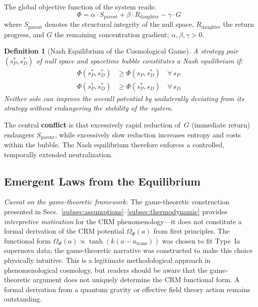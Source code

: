\documentclass[aps,prd,twocolumn,superscriptaddress,nofootinbib]{revtex4-2}
\newtheorem{definition}{Definition}
\begin{document}
The global objective function of the system reads:
\begin{equation}
\Phi = \alpha \cdot S_{\mathrm{parent}} + \beta \cdot R_{\mathrm{daughter}} - \gamma \cdot G
\label{eq:potential}
\end{equation}
where $S_{\mathrm{parent}}$ denotes the structural integrity of the null space, $R_{\mathrm{daughter}}$ the return progress, and $G$ the remaining concentration gradient; $\alpha, \beta, \gamma > 0$.

\begin{definition}[Nash Equilibrium of the Cosmological Game]
A strategy pair $(s_P^*, s_D^*)$ of null space and spacetime bubble constitutes a Nash equilibrium if:
\begin{align}
\Phi(s_P^*, s_D^*) &\geq \Phi(s_P, s_D^*) \quad \forall\, s_P \\
\Phi(s_P^*, s_D^*) &\geq \Phi(s_P^*, s_D) \quad \forall\, s_D
\end{align}
Neither side can improve the overall potential by unilaterally deviating from its strategy without endangering the stability of the system.
\end{definition}

The central \textbf{conflict} is that excessively rapid reduction of~$G$ (immediate return) endangers $S_{\mathrm{parent}}$, while excessively slow reduction increases entropy and costs within the bubble. The Nash equilibrium therefore enforces a controlled, temporally extended neutralization.


\subsection{Emergent Laws from the Equilibrium}
\label{subsec:emergentlaws}

\textit{Caveat on the game-theoretic framework:} The game-theoretic construction presented in Secs.~\ref{subsec:assumptions}--\ref{subsec:thermodynamic} provides \emph{interpretive motivation} for the CRM phenomenology---it does not constitute a formal derivation of the CRM potential $\Omega_\Phi(a)$ from first principles. The functional form $\Omega_\Phi(a) \propto \tanh(k(a - a_\mathrm{trans}))$ was chosen to fit Type~Ia supernova data; the game-theoretic narrative was constructed to make this choice physically intuitive. This is a legitimate methodological approach in phenomenological cosmology, but readers should be aware that the game-theoretic argument does not uniquely determine the CRM functional form. A formal derivation from a quantum gravity or effective field theory action remains outstanding.
\end{document}
